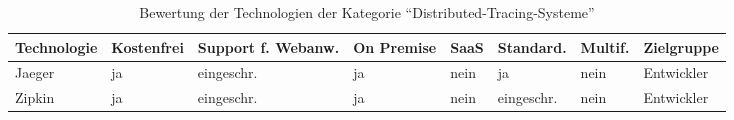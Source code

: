 \begin{table}[H]%
\centering
\addtolength{\leftskip}{-2cm}
\addtolength{\rightskip}{-2cm}
\begin{tabular}{|p{3.05cm}|p{1.8cm}|p{1.7cm}|p{1.2cm}|p{1.3cm}|p{1.7cm}|p{1.3cm}|p{2.6cm}|}
\hline
Technologie & Kostenfrei & Support f. Webanw. & On \mbox{Premise} & SaaS & Standard. & Multif. & Zielgruppe \\
\hline
Jaeger & ja & eingeschr. & ja & nein & ja & nein & Entwickler \\
\hline
Zipkin & ja & eingeschr. & ja & nein & eingeschr. & nein & Entwickler \\
\hline
\end{tabular}
\caption{Bewertung der Technologien der Kategorie \enquote{Distributed-Tracing-Systeme}}
\label{tab:technologie-bewertung-distributed-tracing-systeme}
\end{table}
